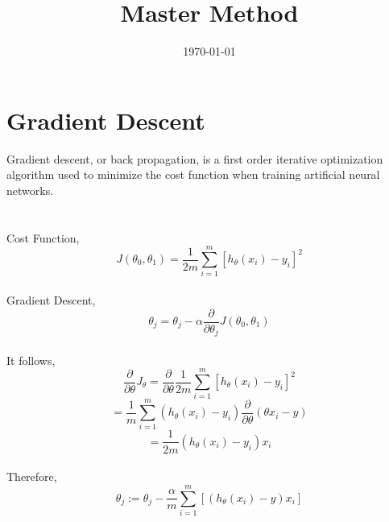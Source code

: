 \documentclass[a4paper, 12pt]{article}
\begin{document}
\title{Master Method}
\date{\today}
\section{Gradient Descent}
	Gradient descent, or back propagation, is a first order iterative optimization algorithm used to minimize the cost function when training artificial neural networks.\\
	\\
	\\
	Cost Function, $$J(\theta_0, \theta_1) = \frac{1}{2m} \sum_{i=1}^{m} [h_\theta (x_i) - y_i]^2 $$
	\\
	Gradient Descent,
	$$\theta_j = \theta_j - \alpha \frac{\partial}{\partial \theta_j} J(\theta_0, \theta_1)
	$$
	\\
	It follows,
	$$\frac{\partial}{\partial \theta} J_\theta = \frac{\partial}{\partial \theta} \frac{1}{2m} \sum_{i=1}^{m} [h_\theta (x_i) - y_i]^2
	$$
	$$= \frac{1}{m} \sum_{i=1}^{m} (h_\theta (x_i) - y_i) \frac{\partial}{\partial \theta} (\theta x_i - y)
	$$
	$$= \frac{1}{2m} (h_\theta (x_i) - y_i) x_i
	$$
	\\
	Therefore,
	$$ \theta_j := \theta_j - \frac{\alpha}{m} \sum_{i=1}^{m}[(h_\theta(x_i) - y) x_i]
	$$
\end{document}
